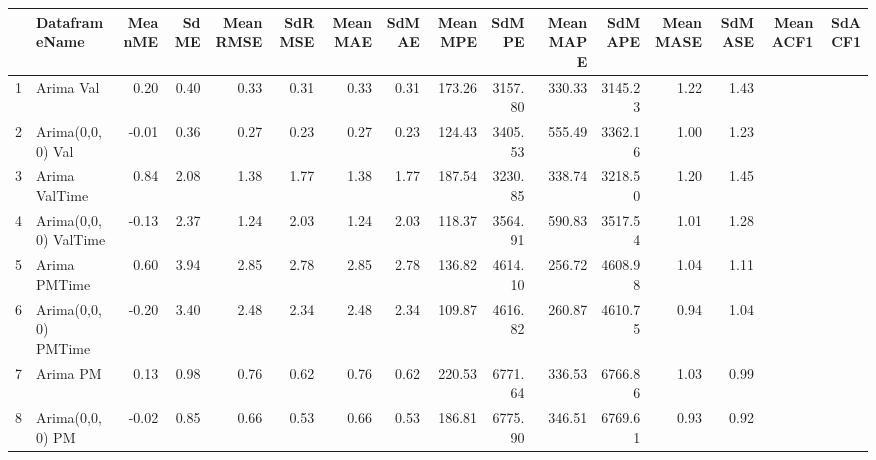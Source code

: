 \begin{table}[ht]
\centering
\begin{tabular}{rlrrrrrrrrrrrrrr}
  \hline
 & DataframeName & MeanME & SdME & MeanRMSE & SdRMSE & MeanMAE & SdMAE & MeanMPE & SdMPE & MeanMAPE & SdMAPE & MeanMASE & SdMASE & MeanACF1 & SdACF1 \\ 
  \hline
1 & Arima Val & 0.20 & 0.40 & 0.33 & 0.31 & 0.33 & 0.31 & 173.26 & 3157.80 & 330.33 & 3145.23 & 1.22 & 1.43 &  &  \\ 
  2 & Arima(0,0,0) Val & -0.01 & 0.36 & 0.27 & 0.23 & 0.27 & 0.23 & 124.43 & 3405.53 & 555.49 & 3362.16 & 1.00 & 1.23 &  &  \\ 
  3 & Arima ValTime & 0.84 & 2.08 & 1.38 & 1.77 & 1.38 & 1.77 & 187.54 & 3230.85 & 338.74 & 3218.50 & 1.20 & 1.45 &  &  \\ 
  4 & Arima(0,0,0) ValTime & -0.13 & 2.37 & 1.24 & 2.03 & 1.24 & 2.03 & 118.37 & 3564.91 & 590.83 & 3517.54 & 1.01 & 1.28 &  &  \\ 
  5 & Arima PMTime & 0.60 & 3.94 & 2.85 & 2.78 & 2.85 & 2.78 & 136.82 & 4614.10 & 256.72 & 4608.98 & 1.04 & 1.11 &  &  \\ 
  6 & Arima(0,0,0) PMTime & -0.20 & 3.40 & 2.48 & 2.34 & 2.48 & 2.34 & 109.87 & 4616.82 & 260.87 & 4610.75 & 0.94 & 1.04 &  &  \\ 
  7 & Arima PM & 0.13 & 0.98 & 0.76 & 0.62 & 0.76 & 0.62 & 220.53 & 6771.64 & 336.53 & 6766.86 & 1.03 & 0.99 &  &  \\ 
  8 & Arima(0,0,0) PM & -0.02 & 0.85 & 0.66 & 0.53 & 0.66 & 0.53 & 186.81 & 6775.90 & 346.51 & 6769.61 & 0.93 & 0.92 &  &  \\ 
   \hline
\end{tabular}
\end{table}
